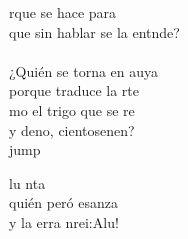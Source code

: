 \begin{cancion}
	rque se hace para \\
	que sin hablar se la entnde?\\
	\jump\\
	¿Quién se torna en auya\\
	porque traduce la rte\\
	mo el trigo que se re \\
	y deno, cientosenen?\\jump\\
	\begin{chorus}%
	lu nta \\
	quién peró esanza\\
	y la erra nrei:Alu!\\
	\end{chorus}%
	\jump\\
\end{cancion}%
